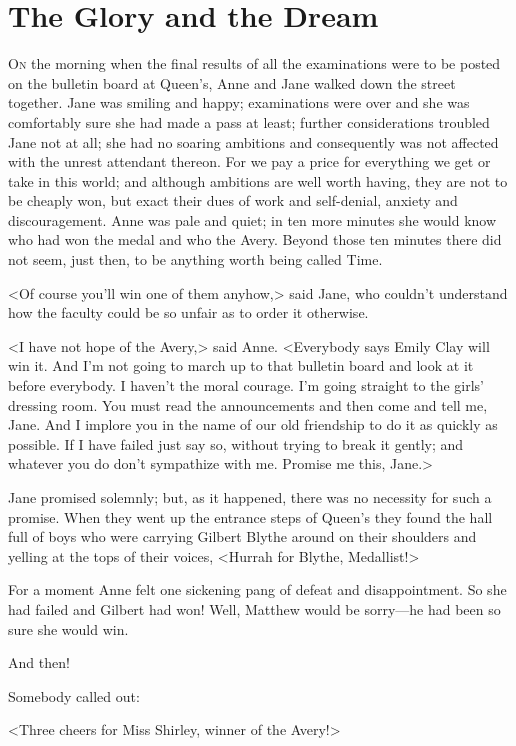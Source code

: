 \chapter{The Glory and the Dream}

\lettrine{O}{n} the morning when the final results of all the examinations were to be posted on the bulletin board at Queen's, Anne and Jane walked down the street together. Jane was smiling and happy; examinations were over and she was comfortably sure she had made a pass at least; further considerations troubled Jane not at all; she had no soaring ambitions and consequently was not affected with the unrest attendant thereon. For we pay a price for everything we get or take in this world; and although ambitions are well worth having, they are not to be cheaply won, but exact their dues of work and self-denial, anxiety and discouragement. Anne was pale and quiet; in ten more minutes she would know who had won the medal and who the Avery. Beyond those ten minutes there did not seem, just then, to be anything worth being called Time.

<Of course you'll win one of them anyhow,> said Jane, who couldn't understand how the faculty could be so unfair as to order it otherwise.

<I have not hope of the Avery,> said Anne. <Everybody says Emily Clay will win it. And I'm not going to march up to that bulletin board and look at it before everybody. I haven't the moral courage. I'm going straight to the girls' dressing room. You must read the announcements and then come and tell me, Jane. And I implore you in the name of our old friendship to do it as quickly as possible. If I have failed just say so, without trying to break it gently; and whatever you do don't sympathize with me. Promise me this, Jane.>

Jane promised solemnly; but, as it happened, there was no necessity for such a promise. When they went up the entrance steps of Queen's they found the hall full of boys who were carrying Gilbert Blythe around on their shoulders and yelling at the tops of their voices, <Hurrah for Blythe, Medallist!>

For a moment Anne felt one sickening pang of defeat and disappointment. So she had failed and Gilbert had won! Well, Matthew would be sorry—he had been so sure she would win.

And then!

Somebody called out:

<Three cheers for Miss Shirley, winner of the Avery!>

